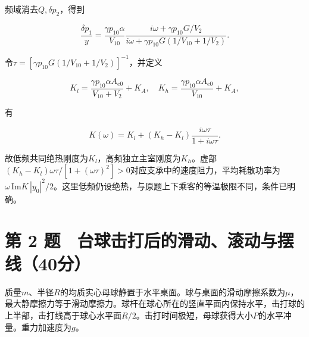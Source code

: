 \documentclass[12pt,a4paper,fontset=fandol]{ctexart}
\begin{document}
频域消去\(Q,\delta p_2\)，得到

\[
\frac{\delta p_1}{y}
=\frac{\gamma p_{10}\alpha}{V_{10}}
\frac{i\omega+\gamma p_{10}G/V_2}
{i\omega+\gamma p_{10}G(1/V_{10}+1/V_2)}.
\]

令\(\tau=[\gamma p_{10}G(1/V_{10}+1/V_2)]^{-1}\)，并定义

\[
K_l=\frac{\gamma p_{10}\alpha A_{e0}}{V_{10}+V_2}+K_A,
\quad K_h=\frac{\gamma p_{10}\alpha A_{e0}}{V_{10}}+K_A,
\]

有

\[
K(\omega)=K_l+(K_h-K_l)\frac{i\omega\tau}{1+i\omega\tau}.
\]

故低频共同绝热刚度为\(K_l\)，高频独立主室刚度为\(K_h\)。虚部\((K_h-K_l)\omega\tau/[1+(\omega\tau)^2]>0\)对应支承中的速度阻力，平均耗散功率为\(\omega\,\mathrm{Im}K\,|y_0|^2/2\)。这里低频仍设绝热，与原题上下乘客的等温极限不同，条件已明确。

\clearpage

\section{第 2
题　台球击打后的滑动、滚动与摆线（40分）}\label{ux7b2c-2-ux9898-ux53f0ux7403ux51fbux6253ux540eux7684ux6ed1ux52a8ux6edaux52a8ux4e0eux6446ux7ebf40ux5206}

质量\(m\)、半径\(R\)的均质实心母球静置于水平桌面。球与桌面的滑动摩擦系数为\(\mu\)，最大静摩擦力等于滑动摩擦力。球杆在球心所在的竖直平面内保持水平，击打球的上半部，击打线高于球心水平面\(R/2\)。击打时间极短，母球获得大小\(P\)的水平冲量。重力加速度为\(g\)。

\begin{center}
\begin{minipage}{\linewidth}
\centering\begingroup{}
\ifdim\wd\diagrambox>.88\linewidth
\sbox{\diagrambox}{\resizebox{.88\linewidth}{!}{\usebox{\diagrambox}}}\fi
\ifdim\ht\diagrambox>.38\textheight
\resizebox{!}{.38\textheight}{\usebox{\diagrambox}}
\else\usebox{\diagrambox}\fi
\par{}\endgroup\end{minipage}\end{center}
\end{document}
